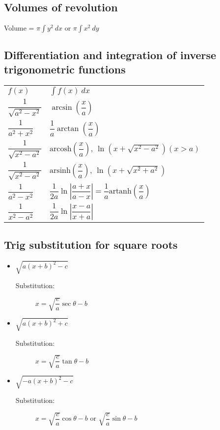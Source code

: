\subsection{Volumes of revolution}
Volume = $\pi\int y^2 \: dx$ or $\pi\int x^2 \: dy$

\subsection{Differentiation and integration of inverse trigonometric functions }
\begin{tabular}{ll}
	$f(x)$ & $\int f(x) \: dx$\\
	$\dfrac{1}{\sqrt{a^2-x^2}}$ & $\arcsin(\dfrac{x}{a})$\\
	$\dfrac{1}{a^2+x^2}$ & $\dfrac{1}{a}\arctan(\dfrac{x}{a})$\\
	$\dfrac{1}{\sqrt{x^2-a^2}}$ & $\text{arcosh}(\dfrac{x}{a})$, $\ln(x+\sqrt{x^2-a^2}) (x>a)$\\
	$\dfrac{1}{\sqrt{x^2-a^2}}$ & $\text{arsinh}(\dfrac{x}{a})$, $\ln(x+\sqrt{x^2+a^2})$\\
	$\dfrac{1}{a^2-x^2}$ & $\dfrac{1}{2a}\ln |\dfrac{a+x}{a-x}| = \dfrac{1}{a}\text{artanh}(\dfrac{x}{a})$\\
	$\dfrac{1}{x^2-a^2}$ & $\dfrac{1}{2a}\ln |\dfrac{x-a}{x+a}|$\\
\end{tabular}

\subsection{Trig substitution for square roots}
\begin{itemize}
	\item $\sqrt{a(x+b)^2-c}$
	\begin{description}
		\item[Substitution:] $x = \sqrt{\dfrac{c}{a}}\sec\theta - b$
	\end{description}
	\item $\sqrt{a(x+b)^2+c}$
	\begin{description}
		\item[Substitution:] $x = \sqrt{\dfrac{c}{a}}\tan\theta - b$
	\end{description}
	\item $\sqrt{-a(x+b)^2-c}$
	\begin{description}
		\item[Substitution:] $x = \sqrt{\dfrac{c}{a}}\cos\theta - b$ or $\sqrt{\dfrac{c}{a}}\sin\theta - b$
	\end{description}
	
\end{itemize}

